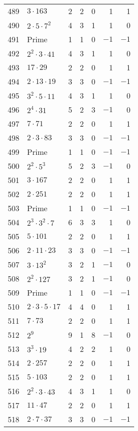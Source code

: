 \documentclass[12pt]{article}
\begin{document}
\begin{tabular}{|r|l|r|r|r|r|r|}
489 & $3 \cdot 163$ & 2 & 2 & 0 & 1 & 1 \\
490 & $2 \cdot 5 \cdot 7^2$ & 4 & 3 & 1 & 1 & 0 \\
491 & Prime & 1 & 1 & 0 & $-1$ & $-1$ \\
492 & $2^2 \cdot 3 \cdot 41$ & 4 & 3 & 1 & 1 & 0 \\
493 & $17 \cdot 29$ & 2 & 2 & 0 & 1 & 1 \\
494 & $2 \cdot 13 \cdot 19$ & 3 & 3 & 0 & $-1$ & $-1$ \\
495 & $3^2 \cdot 5 \cdot 11$ & 4 & 3 & 1 & 1 & 0 \\
496 & $2^4 \cdot 31$ & 5 & 2 & 3 & $-1$ & 0 \\
497 & $7 \cdot 71$ & 2 & 2 & 0 & 1 & 1 \\
498 & $2 \cdot 3 \cdot 83$ & 3 & 3 & 0 & $-1$ & $-1$ \\
499 & Prime & 1 & 1 & 0 & $-1$ & $-1$ \\
500 & $2^2 \cdot 5^3$ & 5 & 2 & 3 & $-1$ & 0 \\
501 & $3 \cdot 167$ & 2 & 2 & 0 & 1 & 1 \\
502 & $2 \cdot 251$ & 2 & 2 & 0 & 1 & 1 \\
503 & Prime & 1 & 1 & 0 & $-1$ & $-1$ \\
504 & $2^3 \cdot 3^2 \cdot 7$ & 6 & 3 & 3 & 1 & 0 \\
505 & $5 \cdot 101$ & 2 & 2 & 0 & 1 & 1 \\
506 & $2 \cdot 11 \cdot 23$ & 3 & 3 & 0 & $-1$ & $-1$ \\
507 & $3 \cdot 13^2$ & 3 & 2 & 1 & $-1$ & 0 \\
508 & $2^2 \cdot 127$ & 3 & 2 & 1 & $-1$ & 0 \\
509 & Prime & 1 & 1 & 0 & $-1$ & $-1$ \\
510 & $2 \cdot 3 \cdot 5 \cdot 17$ & 4 & 4 & 0 & 1 & 1 \\
511 & $7 \cdot 73$ & 2 & 2 & 0 & 1 & 1 \\
512 & $2^9$ & 9 & 1 & 8 & $-1$ & 0 \\
513 & $3^3 \cdot 19$ & 4 & 2 & 2 & 1 & 0 \\
514 & $2 \cdot 257$ & 2 & 2 & 0 & 1 & 1 \\
515 & $5 \cdot 103$ & 2 & 2 & 0 & 1 & 1 \\
516 & $2^2 \cdot 3 \cdot 43$ & 4 & 3 & 1 & 1 & 0 \\
517 & $11 \cdot 47$ & 2 & 2 & 0 & 1 & 1 \\
518 & $2 \cdot 7 \cdot 37$ & 3 & 3 & 0 & $-1$ & $-1$ \\

\end{tabular}
\end{document}
